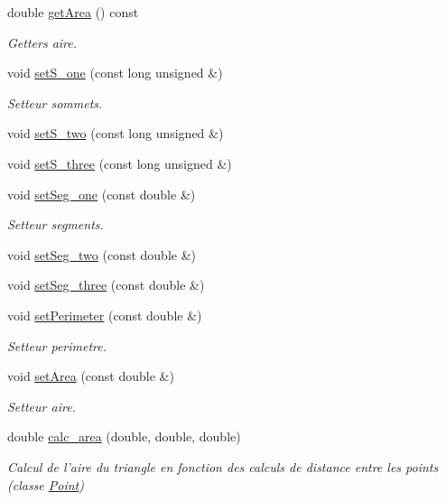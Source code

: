 \begin{DoxyCompactItemize}
double \hyperlink{class_face_a58beb8ce1b9f8154379db998a02ffa3d}{get\-Area} () const 
\begin{DoxyCompactList}\small\item\em Getters aire. \end{DoxyCompactList}\item 
void \hyperlink{class_face_acb89a29860fd07bb415a52ec9a2fe695}{set\-S\-\_\-one} (const long unsigned \&)
\begin{DoxyCompactList}\small\item\em Setteur sommets. \end{DoxyCompactList}\item 
void \hyperlink{class_face_a8cd35d467fbfc7d88f415884221b38d4}{set\-S\-\_\-two} (const long unsigned \&)
\item 
void \hyperlink{class_face_ac362a97171117e0ab8f7b0b1506569c2}{set\-S\-\_\-three} (const long unsigned \&)
\item 
void \hyperlink{class_face_a6c888b3f4933cc7c9b5ab80c50be90c9}{set\-Seg\-\_\-one} (const double \&)
\begin{DoxyCompactList}\small\item\em Setteur segments. \end{DoxyCompactList}\item 
void \hyperlink{class_face_a92f7231d63697ec23256996bd0616914}{set\-Seg\-\_\-two} (const double \&)
\item 
void \hyperlink{class_face_abf8ca26e677a7586dfad0f98354d6036}{set\-Seg\-\_\-three} (const double \&)
\item 
void \hyperlink{class_face_a2267f8f5421c51567e3ca480fb82f136}{set\-Perimeter} (const double \&)
\begin{DoxyCompactList}\small\item\em Setteur perimetre. \end{DoxyCompactList}\item 
void \hyperlink{class_face_a4755a95a7ae6cbc85c423cb6ce5b28df}{set\-Area} (const double \&)
\begin{DoxyCompactList}\small\item\em Setteur aire. \end{DoxyCompactList}\item 
double \hyperlink{class_face_a8cf54d48850c799b9a86b7bcf9942c19}{calc\-\_\-area} (double, double, double)
\begin{DoxyCompactList}\small\item\em Calcul de l'aire du triangle en fonction des calculs de distance entre les points (classe \hyperlink{class_point}{Point}) \end{DoxyCompactList}\end{DoxyCompactItemize}


